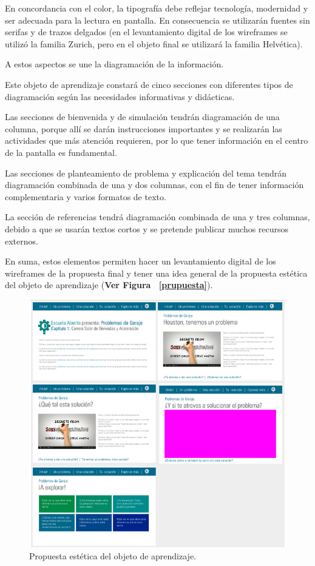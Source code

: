\documentclass[twoside,letterpaper,11pt]{report}
\begin{document}
En concordancia con el color, la tipografía debe reflejar tecnología, modernidad y ser adecuada para la lectura en pantalla. En consecuencia se utilizarán fuentes sin serifas y de trazos delgados (en el levantamiento digital de los wireframes se utilizó la familia Zurich, pero en el objeto final se utilizará la familia Helvética).

A estos aspectos se une la diagramación de la información.

Este objeto de aprendizaje constará de cinco secciones con diferentes tipos de diagramación según las necesidades informativas y didácticas.

Las secciones de bienvenida y de simulación tendrán diagramación de una columna, porque allí se darán instrucciones importantes y se realizarán las actividades que más atención requieren, por lo que tener información en el centro de la pantalla es fundamental.

Las secciones de planteamiento de problema y explicación del tema tendrán diagramación combinada de una y dos columnas, con el fin de tener información complementaria y varios formatos de texto.

La sección de referencias tendrá diagramación combinada de una y tres columnas, debido a que se usarán textos cortos y se pretende publicar muchos recursos externos.

En suma, estos elementos permiten hacer un levantamiento digital de los wireframes de la propuesta final y tener una idea general de la propuesta estética del objeto de aprendizaje (\textbf{Ver Figura ~\ref{prupuesta}}).


\begin{figure}[h!]
\label{propuesta}
\centering
\includegraphics[width=1\textwidth]{aux/propuestaEstetica}
\caption{Propuesta estética del objeto de aprendizaje.}
\end{figure}
\end{document}

